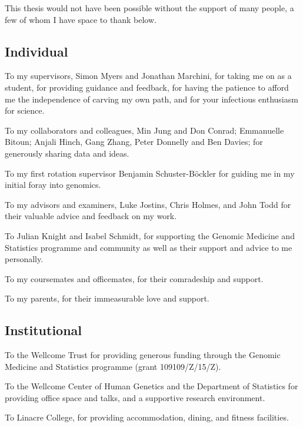 
This thesis would not have been possible without the support of many people, a few of whom I have space to thank below.

\subsection*{Individual}

To my supervisors, Simon Myers and Jonathan Marchini, for taking me on as a student, for providing guidance and feedback, for having the patience to afford me the independence of carving my own path, and for your infectious enthusiasm for science.

To my collaborators and colleagues, Min Jung and Don Conrad; Emmanuelle Bitoun; Anjali Hinch, Gang Zhang, Peter Donnelly and Ben Davies; for generously sharing data and ideas.

To my first rotation supervisor Benjamin Schuster-Böckler for guiding me in my initial foray into genomics.

To my advisors and examiners, Luke Jostins, Chris Holmes, and John Todd for their valuable advice and feedback on my work.

To Julian Knight and Isabel Schmidt, for supporting the Genomic Medicine and Statistics programme and community as well as their support and advice to me personally.

To my coursemates and officemates, for their comradeship and support.

To my parents, for their immeasurable love and support.

\subsection*{Institutional}

To the Wellcome Trust for providing generous funding through the Genomic Medicine and Statistics programme (grant 109109/Z/15/Z).

To the Wellcome Center of Human Genetics and the Department of Statistics for providing office space and talks, and a supportive research environment.

To Linacre College, for providing accommodation, dining, and fitness facilities.